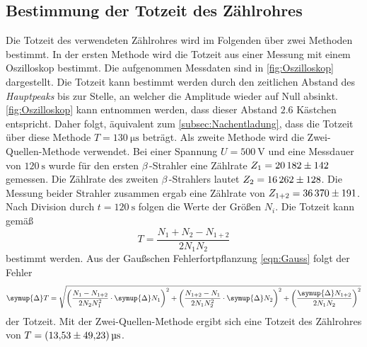 \subsection{Bestimmung der Totzeit des Zählrohres}
\label{subsec:A_Totzeit}
Die Totzeit des verwendeten Zählrohres wird im Folgenden über zwei Methoden bestimmt. 
In der ersten Methode wird die Totzeit aus einer Messung mit einem Oszilloskop bestimmt. Die aufgenommen Messdaten sind in \autoref{fig:Oszilloskop} dargestellt.
Die Totzeit kann bestimmt werden durch den zeitlichen Abstand des \textit{Hauptpeaks} bis zur Stelle, an welcher die Amplitude wieder auf Null absinkt. \autoref{fig:Oszilloskop} kann entnommen 
werden, dass dieser Abstand $\num{2.6}$ Kästchen entspricht. Daher folgt, äquivalent zum \autoref{subsec:Nachentladung}, dass die Totzeit über diese Methode 
$T = \qty{130}{\micro\second}$ beträgt.
Als zweite Methode wird die Zwei-Quellen-Methode verwendet. Bei einer Spannung $U = \qty{500}{\volt}$ und eine Messdauer von $\qty{120}{\second}$ wurde für den ersten 
$\beta$\,-Strahler eine Zählrate $Z_1 = \num{20182 +- 142}$ gemessen. Die Zählrate des zweiten $\beta$\,-Strahlers lautet $Z_2 = \num{16262 +- 128}$. Die Messung beider 
Strahler zusammen ergab eine Zählrate von $Z_{1+2} = \num{36370 +- 191}$. Nach Division durch $t = \qty{120}{\second}$ folgen die Werte der Größen $N_i$.
Die Totzeit kann gemäß 
\begin{equation}
  \label{eqn:Totzeit}
  T = \frac{N_1 + N_2 - N_{1+2}}{2N_1N_2}
\end{equation}
bestimmt werden. 
Aus der Gaußschen Fehlerfortpflanzung \eqref{eqn:Gauss} folgt der Fehler
\begin{equation*}
  \symup{\Delta}T = \sqrt{\left(\frac{N_1 - N_{1+2}}{2N_2 N_1^2} \cdot \symup{\Delta}N_1 \right)^2 + \left(\frac{N_{1+2} - N_{1}}{2N_1 N_2^2} \cdot \symup{\Delta}N_2 \right)^2
  + \left( \frac{\symup{\Delta}N_{1+2}}{2N_1 N_2}\right)^2} 
\end{equation*}
der Totzeit.
Mit der Zwei-Quellen-Methode ergibt sich eine Totzeit des Zählrohres von $T = \qty{13.53+-49.23}{\micro\second}$.


